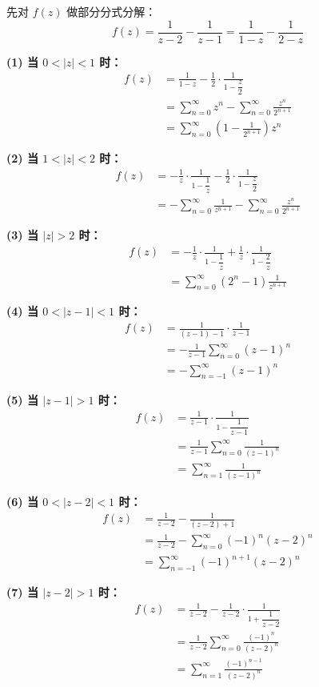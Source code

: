 \documentclass[openany,oneside]{ctexbook}
\begin{document}
\begin{solution}
先对 \( f(z) \) 做部分分式分解：
\[
f(z) = \frac{1}{z-2} - \frac{1}{z-1} = \frac{1}{1-z} - \frac{1}{2-z}
\]

\noindent
\textbf{(1) 当 \( 0<|z|<1 \) 时：}
\[
\begin{aligned}
f(z) &= \frac{1}{1-z} - \frac{1}{2} \cdot \frac{1}{1-\dfrac{z}{2}} \\
&= \sum_{n=0}^{\infty} z^n - \sum_{n=0}^{\infty} \frac{z^n}{2^{n+1}} \\
&= \sum_{n=0}^{\infty} \left(1 - \frac{1}{2^{n+1}}\right) z^n
\end{aligned}
\]

\noindent
\textbf{(2) 当 \( 1<|z|<2 \) 时：}
\[
\begin{aligned}
f(z) &= -\frac{1}{z} \cdot \frac{1}{1-\dfrac{1}{z}} - \frac{1}{2} \cdot \frac{1}{1-\dfrac{z}{2}} \\
&= -\sum_{n=0}^{\infty} \frac{1}{z^{n+1}} - \sum_{n=0}^{\infty} \frac{z^n}{2^{n+1}}
\end{aligned}
\]

\noindent
\textbf{(3) 当 \( |z|>2 \) 时：}
\[
\begin{aligned}
f(z) &= -\frac{1}{z} \cdot \frac{1}{1-\dfrac{1}{z}} + \frac{1}{z} \cdot \frac{1}{1-\dfrac{2}{z}} \\
&= \sum_{n=0}^{\infty} \left(2^n - 1\right) \frac{1}{z^{n+1}}
\end{aligned}
\]

\noindent
\textbf{(4) 当 \( 0<|z-1|<1 \) 时：}
\[
\begin{aligned}
f(z) &= \frac{1}{(z-1)-1} \cdot \frac{1}{z-1} \\
&= -\frac{1}{z-1} \sum_{n=0}^{\infty} (z-1)^n \\
&= -\sum_{n=-1}^{\infty} (z-1)^n
\end{aligned}
\]

\noindent
\textbf{(5) 当 \( |z-1|>1 \) 时：}
\[
\begin{aligned}
f(z) &= \frac{1}{z-1} \cdot \frac{1}{1-\dfrac{1}{z-1}} \\
&= \frac{1}{z-1} \sum_{n=0}^{\infty} \frac{1}{(z-1)^n} \\
&= \sum_{n=1}^{\infty} \frac{1}{(z-1)^n}
\end{aligned}
\]

\noindent
\textbf{(6) 当 \( 0<|z-2|<1 \) 时：}
\[
\begin{aligned}
f(z) &= \frac{1}{z-2} - \frac{1}{(z-2)+1} \\
&= \frac{1}{z-2} - \sum_{n=0}^{\infty} (-1)^n (z-2)^n \\
&= \sum_{n=-1}^{\infty} (-1)^{n+1} (z-2)^n
\end{aligned}
\]

\noindent
\textbf{(7) 当 \( |z-2|>1 \) 时：}
\[
\begin{aligned}
f(z) &= \frac{1}{z-2} - \frac{1}{z-2} \cdot \frac{1}{1+\dfrac{1}{z-2}} \\
&= \frac{1}{z-2} \sum_{n=0}^{\infty} \frac{(-1)^n}{(z-2)^n} \\
&= \sum_{n=1}^{\infty} \frac{(-1)^{n-1}}{(z-2)^n}
\end{aligned}
\]
\end{solution}
\end{document}
